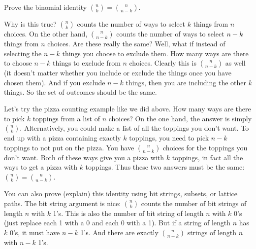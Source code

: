 \documentclass[12pt]{article}
\begin{document}
\begin{example}
  Prove the binomial identity ${n \choose k} = {n \choose n-k}$.
  \begin{solution}
    Why is this true?  ${n \choose k}$ counts the number of ways to select $k$ things from $n$ choices.  On the other hand, ${n \choose n-k}$ counts the number of ways to select $n-k$ things from $n$ choices.  Are these really the same?  Well, what if instead of selecting the $n-k$ things you choose to exclude them.  How many ways are there to choose $n-k$ things to exclude from $n$ choices.  Clearly this is ${n \choose n-k}$ as well (it doesn't matter whether you include or exclude the things once you have chosen them).  And if you exclude $n-k$ things, then you are including the other $k$ things.  So the set of outcomes should be the same.

    Let's try the pizza counting example like we did above.  How many ways are there to pick $k$ toppings from a list of $n$ choices?  On the one hand, the answer is simply ${n \choose k}$.  Alternatively, you could make a list of all the toppings you don't want.  To end up with a pizza containing exactly $k$ toppings, you need to pick $n-k$ toppings to not put on the pizza.  You have ${n \choose n-k}$ choices for the toppings you don't want. Both of these ways give you a pizza with $k$ toppings, in fact all the ways to get a pizza with $k$ toppings.  Thus  these two answers must be the same: ${n \choose k} = {n \choose n-k}$.

    You can also prove (explain) this identity using bit strings, subsets, or lattice paths.  The bit string argument is nice: ${n \choose k}$ counts the number of bit strings of length $n$ with $k$ 1's.  This is also the number of bit string of length $n$ with $k$ 0's (just replace each 1 with a 0 and each 0 with a 1).  But if a string of length $n$ has $k$ 0's, it must have $n-k$ 1's.  And there are exactly ${n\choose n-k}$ strings of length $n$ with $n-k$ 1's.
  \end{solution}
\end{example}
\end{document}
